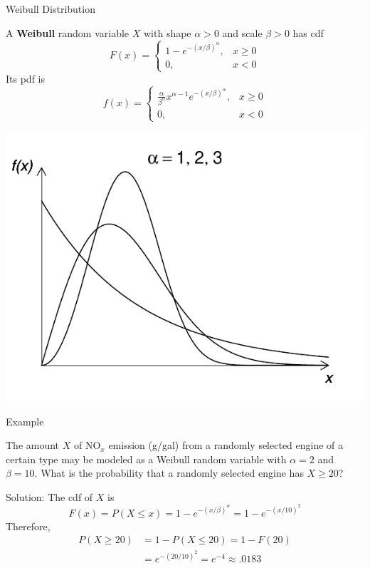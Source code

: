 \documentclass[handout]{beamer}
\renewcommand{\emph}{\textbf}
\begin{document}
\begin{frame}{Weibull Distribution}
\begin{block}{}
A \emph{Weibull} random variable $X$ with shape $\alpha>0$ and scale $\beta>0$ has cdf
$$F(x)=\begin{cases}1-e^{-(x/\beta)^\alpha}, & x\geq 0 \\ 0, & x<0\end{cases}$$
Its pdf is
$$f(x)=\begin{cases}\frac{\alpha}{\beta^\alpha}x^{\alpha-1}e^{-(x/\beta)^\alpha}, & x\geq 0 \\ 0, & x<0\end{cases}$$
\end{block}
\begin{center}
\includegraphics[scale=.5]{ch4_pdf_weibull.pdf}
\end{center}
\end{frame}

\begin{frame}{Example}
\begin{block}{}
The amount $X$ of $\mathrm{NO}_x$ emission (g/gal) from a randomly
selected engine of a certain type may be modeled as a Weibull
random variable with $\alpha=2$ and $\beta=10$. What is the probability that a randomly selected engine has $X \geq 20$?
\end{block}
\pause Solution: The cdf of $X$ is
$$F(x) = P(X \leq x) = 1-e^{-(x/\beta)^\alpha} = 1-e^{-(x/10)^2}$$
\pause Therefore,
\begin{align*}
P(X \geq 20) &= 1-P(X \leq 20) = 1-F(20)\\
&= e^{-(20/10)^2} = e^{-4} \approx .0183
\end{align*}
\end{frame}
\end{document}
